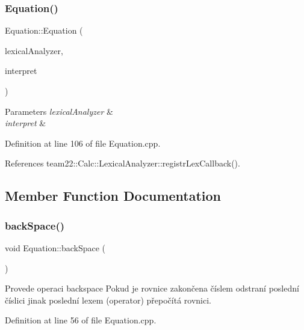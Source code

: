 \subsubsection{\texorpdfstring{Equation()}{Equation()}}
{\footnotesize\ttfamily Equation\+::\+Equation (\begin{DoxyParamCaption}\item[{\hyperlink{classteam22_1_1_calc_1_1_lexical_analyzer}{Lexical\+Analyzer} \&}]{lexical\+Analyzer,  }\item[{\hyperlink{classteam22_1_1_calc_1_1_interpret}{Interpret} \&}]{interpret }\end{DoxyParamCaption})}


\begin{DoxyParams}{Parameters}
{\em lexical\+Analyzer} & \\
\hline
{\em interpret} & \\
\hline
\end{DoxyParams}


Definition at line 106 of file Equation.\+cpp.



References team22\+::\+Calc\+::\+Lexical\+Analyzer\+::registr\+Lex\+Callback().



\subsection{Member Function Documentation}
\mbox{\label{classteam22_1_1_calc_1_1_equation_acccaaf8d823e6f1b7f6831fc0c8c4a62}} 
\subsubsection{\texorpdfstring{back\+Space()}{backSpace()}}
{\footnotesize\ttfamily void Equation\+::back\+Space (\begin{DoxyParamCaption}{ }\end{DoxyParamCaption})}



Provede operaci backspace Pokud je rovnice zakončena číslem odstraní poslední číslici jinak poslední lexem (operator) přepočítá rovnici. 



Definition at line 56 of file Equation.\+cpp.



